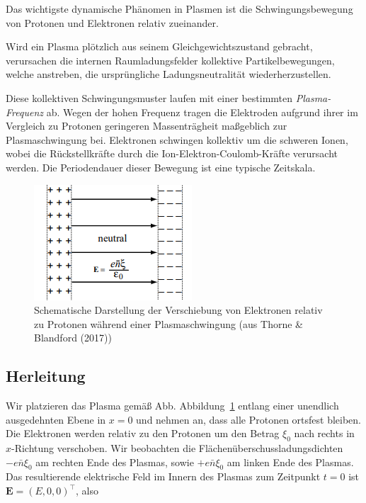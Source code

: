 \documentclass[
  a4paper,
  DIV=11]{scrreprt}
\begin{document}
Das wichtigste dynamische Phänomen in Plasmen ist die
Schwingungsbewegung von Protonen und Elektronen relativ zueinander.

Wird ein Plasma plötzlich aus seinem Gleichgewichtszustand gebracht,
verursachen die internen Raumladungsfelder kollektive
Partikelbewegungen, welche anstreben, die ursprüngliche
Ladungsneutralität wiederherzustellen.

Diese kollektiven Schwingungsmuster laufen mit einer bestimmten
\emph{Plasma-Frequenz} ab. Wegen der hohen Frequenz tragen die
Elektroden aufgrund ihrer im Vergleich zu Protonen geringeren
Massenträgheit maßgeblich zur Plasmaschwingung bei. Elektronen schwingen
kollektiv um die schweren Ionen, wobei die Rückstellkräfte durch die
Ion-Elektron-Coulomb-Kräfte verursacht werden. Die Periodendauer dieser
Bewegung ist eine typische Zeitskala.

\begin{figure}

{\centering \includegraphics{./images/paste-1FB78BDE.png}

}

\caption{\label{fig-osz}Schematische Darstellung der Verschiebung von
Elektronen relativ zu Protonen während einer Plasmaschwingung (aus
Thorne \& Blandford (2017))}

\end{figure}

\hypertarget{herleitung-1}{%
\subsection{Herleitung}\label{herleitung-1}}

Wir platzieren das Plasma gemäß Abb. Abbildung~\ref{fig-osz} entlang
einer unendlich ausgedehnten Ebene in \(x=0\) und nehmen an, dass alle
Protonen ortsfest bleiben. Die Elektronen werden relativ zu den Protonen
um den Betrag \(\xi_0\) nach rechts in \(x\)-Richtung verschoben. Wir
beobachten die Flächenüberschussladungsdichten \(-e \bar n \xi_0\) am
rechten Ende des Plasmas, sowie \(+e \bar n \xi_0\) am linken Ende des
Plasmas. Das resultierende elektrische Feld im Innern des Plasmas zum
Zeitpunkt \(t=0\) ist \(\mathbf E = (E, 0, 0)^\top\), also
\end{document}
